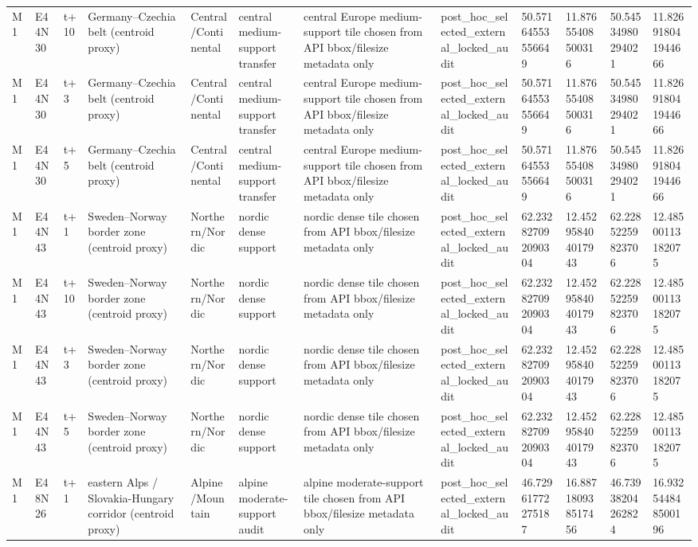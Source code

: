 \begin{landscape}
\begin{longtable}{llllllllllll}
M1 & E44N30 & t+10 & Germany–Czechia belt (centroid proxy) & Central/Continental & central medium-support transfer & central Europe medium-support tile chosen from API bbox/filesize metadata only & post\_hoc\_selected\_external\_locked\_audit & 50.57164553556649 & 11.87655408500316 & 50.54534980294021 & 11.826918041944666 \\
M1 & E44N30 & t+3 & Germany–Czechia belt (centroid proxy) & Central/Continental & central medium-support transfer & central Europe medium-support tile chosen from API bbox/filesize metadata only & post\_hoc\_selected\_external\_locked\_audit & 50.57164553556649 & 11.87655408500316 & 50.54534980294021 & 11.826918041944666 \\
M1 & E44N30 & t+5 & Germany–Czechia belt (centroid proxy) & Central/Continental & central medium-support transfer & central Europe medium-support tile chosen from API bbox/filesize metadata only & post\_hoc\_selected\_external\_locked\_audit & 50.57164553556649 & 11.87655408500316 & 50.54534980294021 & 11.826918041944666 \\
M1 & E44N43 & t+1 & Sweden–Norway border zone (centroid proxy) & Northern/Nordic & nordic dense support & nordic dense tile chosen from API bbox/filesize metadata only & post\_hoc\_selected\_external\_locked\_audit & 62.232827092090304 & 12.452958404017943 & 62.22852259823706 & 12.48500113182075 \\
M1 & E44N43 & t+10 & Sweden–Norway border zone (centroid proxy) & Northern/Nordic & nordic dense support & nordic dense tile chosen from API bbox/filesize metadata only & post\_hoc\_selected\_external\_locked\_audit & 62.232827092090304 & 12.452958404017943 & 62.22852259823706 & 12.48500113182075 \\
M1 & E44N43 & t+3 & Sweden–Norway border zone (centroid proxy) & Northern/Nordic & nordic dense support & nordic dense tile chosen from API bbox/filesize metadata only & post\_hoc\_selected\_external\_locked\_audit & 62.232827092090304 & 12.452958404017943 & 62.22852259823706 & 12.48500113182075 \\
M1 & E44N43 & t+5 & Sweden–Norway border zone (centroid proxy) & Northern/Nordic & nordic dense support & nordic dense tile chosen from API bbox/filesize metadata only & post\_hoc\_selected\_external\_locked\_audit & 62.232827092090304 & 12.452958404017943 & 62.22852259823706 & 12.48500113182075 \\
M1 & E48N26 & t+1 & eastern Alps / Slovakia-Hungary corridor (centroid proxy) & Alpine/Mountain & alpine moderate-support audit & alpine moderate-support tile chosen from API bbox/filesize metadata only & post\_hoc\_selected\_external\_locked\_audit & 46.72961772275187 & 16.887180938517456 & 46.73938204262824 & 16.932544848500196 \\

\end{longtable}
\end{landscape}
